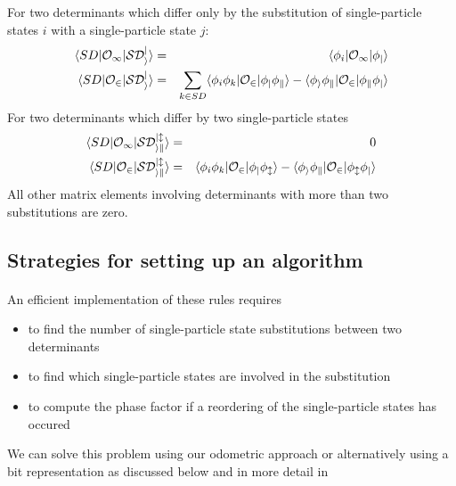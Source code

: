 \documentclass[%
oneside,                 %
final,                   %
10pt]{article}
\begin{document}
For two determinants which differ only by the substitution of single-particle states $i$ with
a single-particle state $j$:
\begin{eqnarray}
  \langle SD | \cal{O}_1 | SD_i^j \rangle & = & \langle \phi_i | \cal{O}_1 | \phi_j \rangle \\
  \langle SD | \cal{O}_2 | SD_i^j \rangle & = & \sum_{k \in SD} 
      \langle \phi_i \phi_k | \cal{O}_2 | \phi_j \phi_k \rangle - 
      \langle \phi_i \phi_k | \cal{O}_2 | \phi_k \phi_j \rangle \nonumber
\end{eqnarray}
For two determinants which differ by two single-particle states
\begin{eqnarray}
  \langle SD | \cal{O}_1 | SD_{ik}^{jl} \rangle & = & 0 \\
  \langle SD | \cal{O}_2 | SD_{ik}^{jl} \rangle & = & 
      \langle \phi_i \phi_k | \cal{O}_2 | \phi_j \phi_l \rangle -
      \langle \phi_i \phi_k | \cal{O}_2 | \phi_l \phi_j \rangle \nonumber 
\end{eqnarray}
All other matrix elements involving determinants with more than two
substitutions are zero.



\subsection*{Strategies for setting up an algorithm}

\paragraph{}

An efficient implementation of these rules requires

\begin{itemize}
\item to find the number of single-particle state substitutions between two determinants

\item to find which single-particle states are involved in the substitution

\item to compute the phase factor if a reordering of the single-particle states has occured
\end{itemize}

\noindent
We can solve this problem using our odometric approach or alternatively using a bit representation as discussed below and in more detail in 
\end{document}

